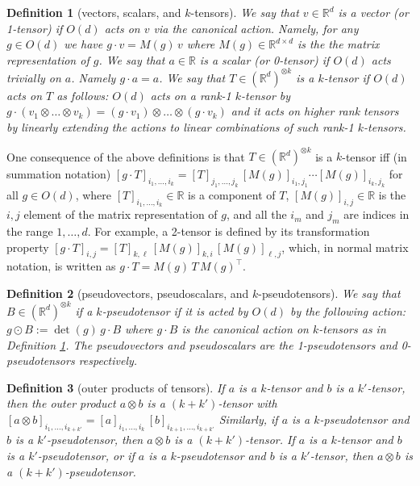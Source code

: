 \documentclass{article}
\theoremstyle{plain}
\newtheorem{definition}{Definition}
\begin{document}
\begin{definition}[vectors, scalars, and $k$-tensors] \label{def.tensors}
We say that $v\in \mathbb R^d$ is a vector (or 1-tensor) if $O(d)$ acts on $v$ via the canonical action. Namely, for any $g\in O(d)$ we have $g\cdot v = M(g)\, v$ where $M(g)\in \mathbb R^{d\times d}$ is the the matrix representation of $g$. We say that $a\in \mathbb R$ is a scalar (or 0-tensor) if $O(d)$ acts trivially on $a$. Namely $g\cdot a = a$.
We say that $T\in (\mathbb R^d)^{\otimes k}$ is a $k$-tensor if $O(d)$ acts on $T$ as follows:
$O(d)$ acts on a rank-1 $k$-tensor by $g\cdot (v_{1}\otimes\ldots \otimes v_k) = (g\cdot v_1)\otimes \ldots \otimes (g\cdot v_k)$ and it acts on higher rank tensors by linearly extending the actions to linear combinations of such rank-1 $k$-tensors.
\end{definition}

One consequence of the above definitions is that 
$T\in (\mathbb R^d)^{\otimes k}$ is a $k$-tensor iff (in summation notation)
$[g\cdot T]_{i_1,\ldots, i_k} = [T]_{j_1,\ldots,j_k}\,[M(g)]_{i_1,j_1}\cdots[M(g)]_{i_k,j_k}$ for all $g\in O(d)$, where $[T]_{i_1, \ldots ,i_k} \in \mathbb R$ is a component of $T$, $[M(g)]_{i,j}\in\mathbb R$ is the $i,j$ element of the matrix representation of $g$, and all the $i_m$ and $j_m$ are indices in the range $1,\ldots,d$.
For example, a 2-tensor is defined by its transformation property
$[g\cdot T]_{i,j} = [T]_{k,\ell}\,[M(g)]_{k,i}\,[M(g)]_{\ell,j}$,
which, in normal matrix notation, is written as
$g\cdot T = M(g)\,T\,M(g)^\top$.



\begin{definition}[pseudovectors, pseudoscalars, and $k$-pseudotensors]
We say that $B\in (\mathbb R^d)^{\otimes k}$ if a $k$-pseudotensor if it is acted by $O(d)$ by the following action: $g\odot B := \det(g)\, g \cdot B$ where $g\cdot B$ is the canonical action on $k$-tensors as in Definition \ref{def.tensors}. The pseudovectors and pseudoscalars are the 1-pseudotensors and 0-pseudotensors respectively.
\end{definition}

\begin{definition}[outer products of tensors]
If $a$ is a $k$-tensor and $b$ is a $k'$-tensor, then the outer product $a\otimes b$ is a $(k+k')$-tensor with $[a\otimes b]_{i_1,\ldots,i_{k+k'}} = [a]_{i_1,\ldots,i_k}\,[b]_{i_{k+1},\ldots,i_{k+k'}}$
Similarly, if $a$ is a $k$-pseudotensor and $b$ is a $k'$-pseudotensor, then $a\otimes b$ is a $(k+k')$-tensor.
If $a$ is a $k$-tensor and $b$ is a $k'$-pseudotensor, or if $a$ is a $k$-pseudotensor and $b$ is a $k'$-tensor, then $a\otimes b$ is a $(k+k')$-pseudotensor.
\end{definition}
\end{document}
